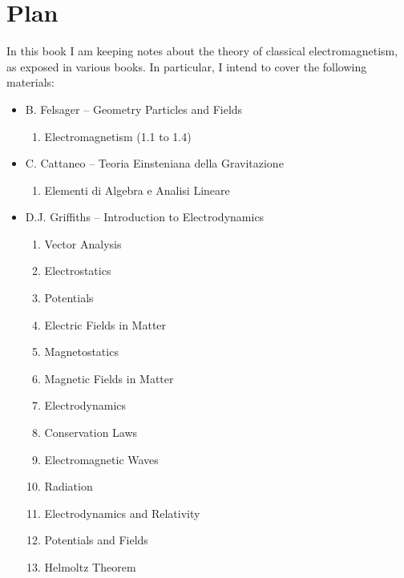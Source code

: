 \chapter*{Plan}
\label{plan} 

In this book I am keeping notes about the theory of classical electromagnetism, 
as exposed in various books. In particular, I intend to cover the following materials:

\begin{itemize}

\item B. Felsager -- Geometry Particles and Fields
\begin{enumerate}
\setcounter{enumi}{0}
\item Electromagnetism (1.1 to 1.4)
\end{enumerate}

\item C. Cattaneo -- Teoria Einsteniana della Gravitazione
\begin{enumerate}
\setcounter{enumi}{0}
\item Elementi di Algebra e Analisi Lineare
\end{enumerate}

\item D.J. Griffiths -- Introduction to Electrodynamics
\begin{enumerate}
\setcounter{enumi}{0}
\item Vector Analysis
\item Electrostatics
\item Potentials
\item Electric Fields in Matter
\item Magnetostatics
\item Magnetic Fields in Matter
\item Electrodynamics
\item Conservation Laws
\item Electromagnetic Waves
\item Radiation
\item Electrodynamics and Relativity
\item Potentials and Fields
\item Helmoltz Theorem
\end{enumerate}


\end{itemize}
